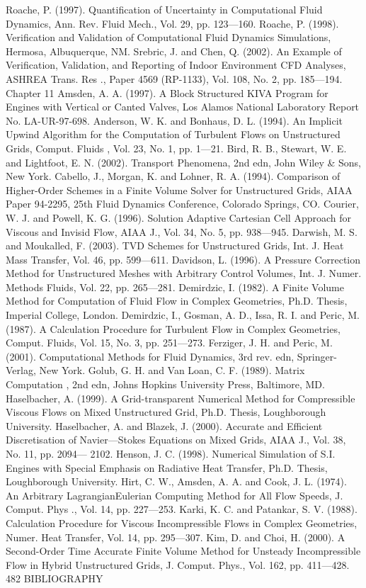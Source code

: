 \documentclass[11pt,a4paper,openany,fontset=none]{ctexbook}
\begin{document}
\begin{sloppypar}
{\small Roache, P. (1997). Quantification of Uncertainty in Computational Fluid Dynamics, Ann. Rev. Fluid Mech., Vol. 29, pp. 123—160. Roache, P. (1998). Verification and Validation of Computational Fluid Dynamics Simulations, Hermosa, Albuquerque, NM. Srebric, J. and Chen, Q. (2002). An Example of Verification, Validation, and Reporting of Indoor Environment CFD Analyses, ASHREA Trans. Res ., Paper 4569 (RP-1133), Vol. 108, No. 2, pp. 185—194. Chapter 11 Amsden, A. A. (1997). A Block Structured KIVA Program for Engines with Vertical or Canted Valves, Los Alamos National Laboratory Report No. LA-UR-97-698. Anderson, W. K. and Bonhaus, D. L. (1994). An Implicit Upwind Algorithm for the Computation of Turbulent Flows on Unstructured Grids, Comput. Fluids , Vol. 23, No. 1, pp. 1—21. Bird, R. B., Stewart, W. E. and Lightfoot, E. N. (2002). Transport Phenomena, 2nd edn, John Wiley \& Sons, New York. Cabello, J., Morgan, K. and Lohner, R. A. (1994). Comparison of Higher-Order Schemes in a Finite Volume Solver for Unstructured Grids, AIAA Paper 94-2295, 25th Fluid Dynamics Conference, Colorado Springs, CO. Courier, W. J. and Powell, K. G. (1996). Solution Adaptive Cartesian Cell Approach for Viscous and Invisid Flow, AIAA J., Vol. 34, No. 5, pp. 938—945. Darwish, M. S. and Moukalled, F. (2003). TVD Schemes for Unstructured Grids, Int. J. Heat Mass Transfer, Vol. 46, pp. 599—611. Davidson, L. (1996). A Pressure Correction Method for Unstructured Meshes with Arbitrary Control Volumes, Int. J. Numer. Methods Fluids, Vol. 22, pp. 265—281. Demirdzic, I. (1982). A Finite Volume Method for Computation of Fluid Flow in Complex Geometries, Ph.D. Thesis, Imperial College, London. Demirdzic, I., Gosman, A. D., Issa, R. I. and Peric, M. (1987). A Calculation Procedure for Turbulent Flow in Complex Geometries, Comput. Fluids, Vol. 15, No. 3, pp. 251—273. Ferziger, J. H. and Peric, M. (2001). Computational Methods for Fluid Dynamics, 3rd rev. edn, Springer-Verlag, New York. Golub, G. H. and Van Loan, C. F. (1989). Matrix Computation , 2nd edn, Johns Hopkins University Press, Baltimore, MD. Haselbacher, A. (1999). A Grid-transparent Numerical Method for Compressible Viscous Flows on Mixed Unstructured Grid, Ph.D. Thesis, Loughborough University. Haselbacher, A. and Blazek, J. (2000). Accurate and Efficient Discretisation of Navier—Stokes Equations on Mixed Grids, AIAA J., Vol. 38, No. 11, pp. 2094— 2102. Henson, J. C. (1998). Numerical Simulation of S.I. Engines with Special Emphasis on Radiative Heat Transfer, Ph.D. Thesis, Loughborough University. Hirt, C. W., Amsden, A. A. and Cook, J. L. (1974). An Arbitrary LagrangianEulerian Computing Method for All Flow Speeds, J. Comput. Phys ., Vol. 14, pp. 227—253. Karki, K. C. and Patankar, S. V. (1988). Calculation Procedure for Viscous Incompressible Flows in Complex Geometries, Numer. Heat Transfer, Vol. 14, pp. 295—307. Kim, D. and Choi, H. (2000). A Second-Order Time Accurate Finite Volume Method for Unsteady Incompressible Flow in Hybrid Unstructured Grids, J. Comput. Phys., Vol. 162, pp. 411—428. 482 BIBLIOGRAPHY}\par

\end{sloppypar}
\end{document}
